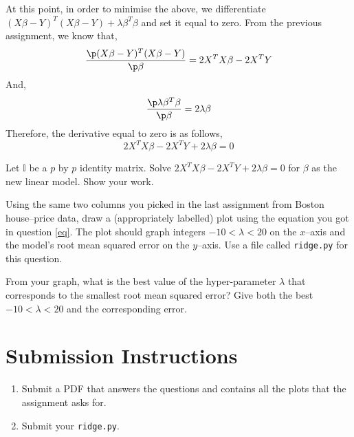 \documentclass{homework}
\begin{document}
At this point, in order to minimise the above, we differentiate $(X\beta - Y)^T(X\beta - Y)+\lambda\beta^T\beta$ and set it equal to zero. From the previous assignment, we know that,
\[
    \frac{\p (X\beta - Y)^T(X\beta - Y)}{\p \beta} = 2X^TX\beta - 2X^TY
\]
And,
\[
    \frac{\p \lambda\beta^T\beta}{\p\beta} = 2\lambda \beta
\]
Therefore, the derivative equal to zero is as follows,
\[
    2X^TX\beta - 2X^TY + 2\lambda \beta = 0
\]

\question\label{eq} Let $\mathbb{I}$ be a $p$ by $p$ identity matrix. Solve $2X^TX\beta - 2X^TY + 2\lambda \beta = 0$ for $\beta$ as the new linear model. Show your work.

\question Using the same two columns you picked in the last assignment from Boston house--price data, draw a (appropriately labelled) plot using the equation you got in question \ref{eq}. The plot should graph integers $-10 < \lambda <20$ on the $x$--axis and the model's root mean squared error on the $y$--axis. Use a file called \texttt{ridge.py} for this question.

\question From your graph, what is the best value of the hyper-parameter $\lambda$ that corresponds to the smallest root mean squared error? Give both the best  $-10 < \lambda <20$ and the corresponding error.

\section*{Submission Instructions}

\begin{enumerate}
    \item Submit a PDF that answers the questions and contains all the plots that the assignment asks for.
    \item Submit your \texttt{ridge.py}.
\end{enumerate}
\end{document}
